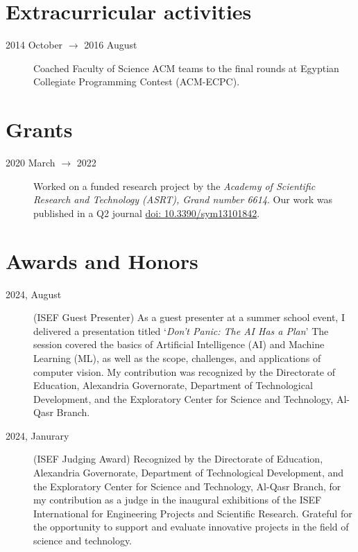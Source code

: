 \documentclass[margin,line]{resume}
\newcommand*{\doi}[1]{\href{http://dx.doi.org/#1}{doi: #1}}
\begin{document}
\begin{resume}
	\section{Extracurricular activities\mysidestyle}\vspace{1mm}
	\begin{description}
		\item[2014 October $\rightarrow$ 2016 August] Coached Faculty of Science ACM teams to the final rounds at Egyptian Collegiate Programming Contest (ACM-ECPC).

	\end{description}

	\section{Grants\mysidestyle}\vspace{1mm}
	\begin{description}
		\item[2020 March $\rightarrow$ 2022] Worked on a funded research project by the \textit{Academy of Scientific Research and Technology (ASRT), Grand number 6614}. Our work was published in a Q2 journal \doi{10.3390/sym13101842}.
	\end{description}

	\section{Awards and Honors\mysidestyle}\vspace{1mm}
	\begin{description}
		\item [2024, August] (ISEF Guest Presenter) As a guest presenter at a summer school event, I delivered a presentation titled `\textit{Don't Panic: The AI Has a Plan}' The session covered the basics of Artificial Intelligence (AI) and Machine Learning (ML), as well as the scope, challenges, and applications of computer vision. My contribution was recognized by the Directorate of Education, Alexandria Governorate, Department of Technological Development, and the Exploratory Center for Science and Technology, Al-Qasr Branch.
		\item[2024, Janurary] (ISEF Judging Award) Recognized by the Directorate of Education, Alexandria Governorate, Department of Technological Development, and the Exploratory Center for Science and Technology, Al-Qasr Branch, for my contribution as a judge in the inaugural exhibitions of the ISEF International for Engineering Projects and Scientific Research. Grateful for the opportunity to support and evaluate innovative projects in the field of science and technology.
	\end{description}



\end{resume}
\end{document}
